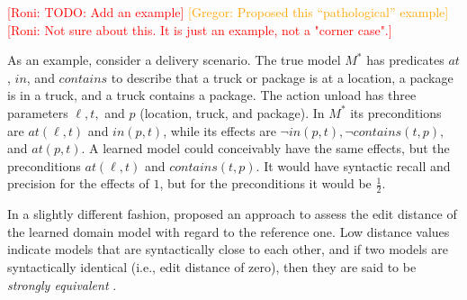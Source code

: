\documentclass{article}
\theoremstyle{definition}
\theoremstyle{remark}
\newcommand{\realm}{\ensuremath{M^*}\xspace}
\newcommand{\roni}[1]{{\textcolor{red}{[Roni: #1]}}}
\newcommand{\mauro}[1]{{\textcolor{green}{[Mauro: #1]}}}
\newcommand{\gregor}[1]{{\textcolor{orange}{[Gregor: #1]}}}
\begin{document}
\roni{TODO: Add an example}
\gregor{Proposed this ``pathological'' example}
\roni{Not sure about this. It is just an example, not a "corner case".}

As an example, consider a delivery scenario.
The true model $\realm$ has predicates $at$, $in$, and $contains$ to describe that a truck or package is at a location, a package is in a truck, and a truck contains a package.
The action unload has three parameters $\ell, t,$ and $p$ (location, truck, and package).
In $\realm$ its preconditions are $at(\ell, t)$ and $in(p,t)$, while its effects are $\neg in(p,t), \neg contains(t,p),$ and $at(p,t)$.
A learned model could conceivably have the same effects, but the preconditions $at(\ell, t)$ and $contains(t,p)$.
It would have syntactic recall and precision for the effects of $1$, but for the preconditions it would be $\frac 1 2$.



In a slightly different fashion, \cite{chrpa2023comparing} proposed an approach to assess the edit distance of the learned domain model with regard to the reference one. Low distance values indicate models that are syntactically close to each other, and if two models are syntactically identical (i.e., edit distance of zero), then they are said to be \textit{strongly equivalent} \citep{chrpa2023comparing}.

\end{document}
